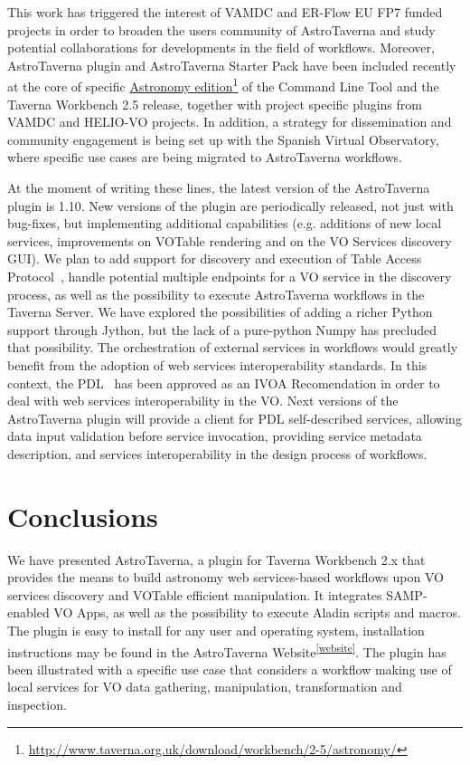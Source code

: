 \documentclass[final,authoryear,5p,times,twocolumn]{elsarticle}
\newcommand{\urlsamefont}[1]{\urlstyle{same}\url{#1}}
\newcommand{\hrefnote}[2]{\href{#1}{#2}\footnote{\urlsamefont{#1}}}
\begin{document}
This work has triggered the interest of VAMDC and ER-Flow EU FP7 funded projects in order to broaden the users community of AstroTaverna and study potential collaborations for developments in the field of workflows. Moreover, AstroTaverna plugin and AstroTaverna Starter Pack have been included recently at the core of specific \hrefnote{http://www.taverna.org.uk/download/workbench/2-5/astronomy/}{Astronomy edition} of the Command Line Tool and the Taverna Workbench 2.5 release, together with project specific plugins from VAMDC and HELIO-VO projects. In addition, a strategy for dissemination and community engagement is being set up with the Spanish Virtual Observatory, where specific use cases are being migrated to AstroTaverna workflows. 

At the moment of writing these lines, the latest version of the AstroTaverna plugin is 1.10. New versions of the plugin are periodically released, not just with bug-fixes, but implementing additional capabilities (e.g. additions of new local services, improvements on VOTable rendering and on the VO Services discovery GUI). We plan to add support for discovery and execution of Table Access Protocol~\citep[TAP;][]{Dowler2010}, handle potential multiple endpoints for a VO service in the discovery process, as well as the possibility to execute AstroTaverna workflows in the Taverna Server. We have explored the possibilities of adding a richer Python support through Jython, but the lack of a pure-python Numpy has precluded that possibility. The orchestration of external services in workflows would greatly benefit from the adoption of web services interoperability standards. In this context, the PDL~\citep[Parameter Description Language;][]{Zwolf2013} has been approved as an IVOA Recomendation in order to deal with web services interoperability in the VO. Next versions of the AstroTaverna plugin will provide a client for PDL self-described services, allowing data input validation before service invocation, providing service metadata description, and services interoperability in the design process of workflows. 

\section{Conclusions}
\label{Conclusions}

We have presented AstroTaverna, a plugin for Taverna Workbench 2.x that provides the means to build astronomy web services-based workflows upon VO services discovery and VOTable efficient manipulation. It integrates SAMP-enabled VO Apps, as well as the possibility to execute Aladin scripts and macros. The plugin is easy to install for any user and operating system, installation instructions may be found in the
AstroTaverna Website\textsuperscript{\ref{website}}. The plugin has been illustrated with a specific use case that considers a workflow making use of local services for VO data gathering, manipulation, transformation and inspection.
\end{document}
